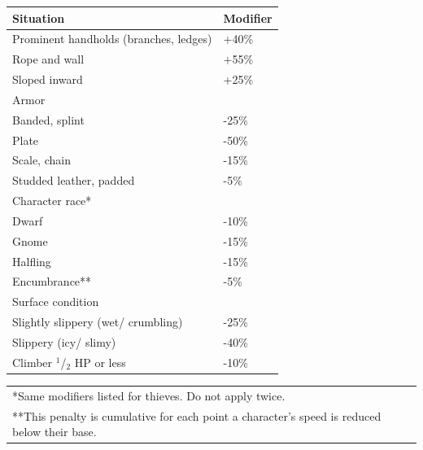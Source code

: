 \begin{multicols}{2}
\noindent
\begin{minipage}{\columnwidth}

\label{climbingmods}
\noindent
\begin{tabular}{|p{}|p{}|}
\hline
Situation								& Modifier \\
\hline\hline
\rowcolor[gray]{.9}Prominent handholds (branches, ledges)	& +40\% \\
Rope and wall							& +55\% \\
\rowcolor[gray]{.9}Sloped inward							& +25\% \\
Armor									& \\
\hspace{2em}Banded, splint						& -25\% \\
\rowcolor[gray]{.9}\hspace{2em}Plate									& -50\% \\
\hspace{2em}Scale, chain							& -15\% \\
\rowcolor[gray]{.9}\hspace{2em}Studded leather, padded				& -5\% \\
Character race*							& \\
\hspace{2em}Dwarf									& -10\% \\
\rowcolor[gray]{.9}\hspace{2em}Gnome									& -15\% \\
\hspace{2em}Halfling								& -15\% \\
\rowcolor[gray]{.9}Encumbrance**							& -5\% \\
Surface condition						& \\
\hspace{2em}Slightly slippery (wet/ crumbling)	& -25\% \\
\rowcolor[gray]{.9}\hspace{2em}Slippery (icy/ slimy)					& -40\% \\
Climber $^1$/$_2$ HP or less			& -10\% \\
\hline
\end{tabular}
\noindent\begin{tabular}{p{}}
*Same modifiers listed for thieves. Do not apply twice. \\
**This penalty is cumulative for each point a character's speed is reduced below their base. \\
\end{tabular}\vspace{.5em}


\end{minipage}
\end{multicols}
